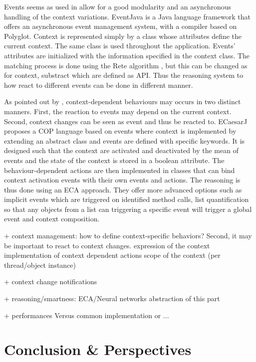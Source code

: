 \documentclass[a4paper]{article}
\begin{document}
Events seems as used in \cite{kamina_eventcj:_2011} allow for a good modularity and an asynchronous handling of the context variations. EventJava \cite{jayaram_context-oriented_2009} is a Java language framework that offers an asynchronous event management system, with a compiler based on Polyglot. Context is represented simply by a class whose attributes define the current context. The same class is used throughout the application. Events' attributes are initialized with the information specified in the context class. The matching process is done using the Rete algorithm \cite{}, but this can be changed as for context, substract which are defined as API. Thus the reasoning system to how react to different events can be done in different manner.

As pointed out by \cite{nunez_declarative_2009}, context-dependent behaviours may occurs in two distinct manners. First, the reaction to events may depend on the current context. Second, context changes can be seen as event and thus be reacted to. ECaesarJ \cite{nunez_declarative_2009} proposes a COP language based on events where context is implemented by extending an abstract class and events are defined with specific keywords. It is designed such that the context are activated and deactivated by the mean of events and the state of the context is stored in a boolean attribute. The behaviour-dependent actions are then implemented in classes that can bind context activation events with their own events and actions. The reasoning is thus done using an ECA approach. They offer more advanced options such as implicit events which are triggered on identified method calls, list quantification so that any objects from a list can triggering a specific event will trigger a global event and context composition.




+ context management: how to define context-specific behaviors? Second, it may be important to react to context changes.
  expression of the context
  implementation of context dependent actions
  scope of the context (per thread/object instance)

+ context change notifications

+ reasoning/smartness: ECA/Neural networks
abstraction of this part


+ performances
  Versus common implementation or ...
  

\section{Conclusion \& Perspectives}

%
%



\end{document}
